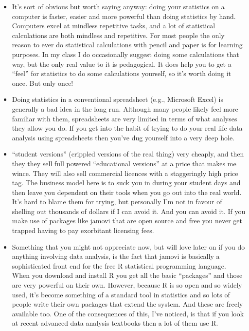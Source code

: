 \documentclass[
]{book}
\providecommand{\tightlist}{%
  \setlength{\itemsep}{0pt}\setlength{\parskip}{0pt}}
\begin{document}
\begin{itemize}
\tightlist
\item
  It's sort of obvious but worth saying anyway: doing your statistics on a computer is faster, easier and more powerful than doing statistics by hand. Computers excel at mindless repetitive tasks, and a lot of statistical calculations are both mindless and repetitive. For most people the only reason to ever do statistical calculations with pencil and paper is for learning purposes. In my class I do occasionally suggest doing some calculations that way, but the only real value to it is pedagogical. It does help you to get a ``feel'' for statistics to do some calculations yourself, so it's worth doing it once. But only once!
\item
  Doing statistics in a conventional spreadsheet (e.g., Microsoft Excel) is generally a bad idea in the long run. Although many people likely feel more familiar with them, spreadsheets are very limited in terms of what analyses they allow you do. If you get into the habit of trying to do your real life data analysis using spreadsheets then you've dug yourself into a very deep hole.
\item
  ``student versions'' (crippled versions of the real thing) very cheaply, and then they they sell full powered ``educational versions'' at a price that makes me wince. They will also sell commercial licences with a staggeringly high price tag. The business model here is to suck you in during your student days and then leave you dependent on their tools when you go out into the real world. It's hard to blame them for trying, but personally I'm not in favour of shelling out thousands of dollars if I can avoid it. And you can avoid it. If you make use of packages like jamovi that are open source and free you never get trapped having to pay exorbitant licensing fees.
\item
  Something that you might not appreciate now, but will love later on if you do anything involving data analysis, is the fact that jamovi is basically a sophisticated front end for the free R statistical programming language. When you download and install R you get all the basic ``packages'' and those are very powerful on their own. However, because R is so open and so widely used, it's become something of a standard tool in statistics and so lots of people write their own packages that extend the system. And these are freely available too. One of the consequences of this, I've noticed, is that if you look at recent advanced data analysis textbooks then a lot of them use R.
\end{itemize}
\end{document}
